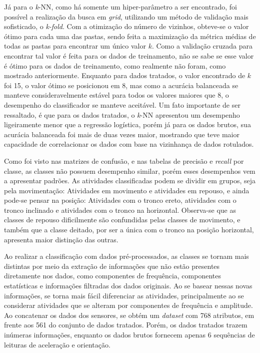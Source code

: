 
Já para o \textit{k}-NN, como há somente um hiper-parâmetro a ser encontrado, foi possível a realização da busca em \textit{grid}, utilizando um método de validação mais sofisticado, o \textit{k-fold}. Com a otimização do número de vizinhos, obteve-se o valor ótimo para cada uma das pastas, sendo feita a maximização da métrica médias de todas as pastas para encontrar um único valor $k$. Como a validação cruzada para encontrar tal valor é feita para os dados de treinamento, não se sabe se esse valor é ótimo para os dados de treinamento, como realmente não foram, como mostrado anteriormente. Enquanto para dados tratados, o valor encontrado de $k$ foi 15, o valor ótimo se posicionou em 8, mas como a acurácia balanceada se manteve consideravelmente estável para todos os valores maiores que 8, o desempenho do classificador se manteve aceitável. Um fato importante de ser ressaltado, é que para os dados tratados, o \textit{k}-NN apresentou um desempenho ligeiramente menor que a regressão logística, porém já para os dados brutos, sua acurácia balanceada foi mais de duas vezes maior, mostrando que teve maior capacidade de correlacionar os dados com base na vizinhança de dados rotulados.



Como foi visto nas matrizes de confusão, e nas tabelas de precisão e \textit{recall} por classe, as classes não possuem desempenho similar, porém esses desempenhos vem a apresentar padrões. As atividades classificadas podem se dividir em grupos, seja pela movimentação: Atividades em movimento e atividades em repouso, e ainda pode-se pensar na posição: Atividades com o tronco ereto, atividades com o tronco inclinado e atividades com o tronco na horizontal. Observa-se que as classes de repouso dificilmente são confundidas pelas classes de movimento, e também que a classe deitado, por ser a única com o tronco na posição horizontal, apresenta maior distinção das outras.


Ao realizar a classificação com dados pré-processados, as classes se tornam mais distintas por meio da extração de informações que não estão presentes diretamente nos dados, como componentes de frequência, componentes estatísticas e informações filtradas dos dados originais. Ao se basear nessas novas informações, se torna mais fácil diferenciar as atividades, principalmente ao se considerar atividades que se alteram por componentes de frequência e amplitude. Ao concatenar os dados dos sensores, se obtém um \textit{dataset} com 768 atributos, em frente aos 561 do conjunto de dados tratados. Porém, os dados tratados trazem inúmeras informações, enquanto os dados brutos fornecem apenas 6 sequências de leituras de aceleração e orientação.

